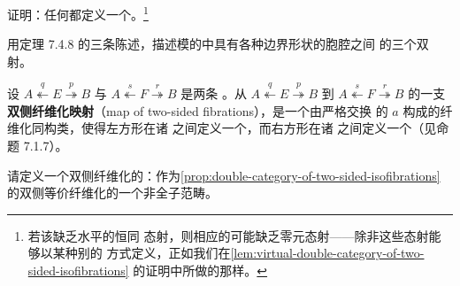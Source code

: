 \begin{exercise}\label{ex:double-defines-virtual}
证明：任何\trDoubleCategory{}都定义一个\trVirtualDoubleCategory{}。\footnote{若该\trDoubleCategory{}缺乏水平的恒同
态射，则相应的\trVirtualDoubleCategory{}可能缺乏零元态射——除非这些态射能够以某种别的
方式定义，正如我们在\cref{lem:virtual-double-category-of-two-sided-isofibrations}
的证明中所做的那样。}
\end{exercise}

\begin{exercise}\label{ex:three-bijections-from-yoneda}
用定理 7.4.8 的三条陈述，描述模的\trVirtualDoubleCategory{}中具有各种边界形状的胞腔之间
的三个双射。
\end{exercise}

\begin{exercise}\label{ex:map-of-two-sided-fibrations}
设 $A\overset{q}{\twoheadleftarrow}E\overset{p}{\twoheadrightarrow}B$ 与
$A\overset{s}{\twoheadleftarrow}F\overset{r}{\twoheadrightarrow}B$ 是两条%
\trTwoSidedFibration{}。从
$A\overset{q}{\twoheadleftarrow}E\overset{p}{\twoheadrightarrow}B$ 到
$A\overset{s}{\twoheadleftarrow}F\overset{r}{\twoheadrightarrow}B$ 的一支%
\textbf{双侧纤维化映射}（map of two-sided fibrations），是一个由严格交换
的\trFunctor{} $a$ 构成的纤维化同构类，使得左方形在诸%
\trCocartesianFibration{}之间定义一个\trCartesianFunctor{}，而右方形在诸%
\trCartesianFibration{}之间定义一个\trCartesianFunctor{}（见命题 7.1.7）。
\begin{center}
\end{center}
请定义一个双侧纤维化的\trDoubleCategory{}：作为\cref{prop:double-category-of-two-sided-isofibrations}
的双侧等价纤维化\trDoubleCategory{}的一个非全子范畴。
\end{exercise}


